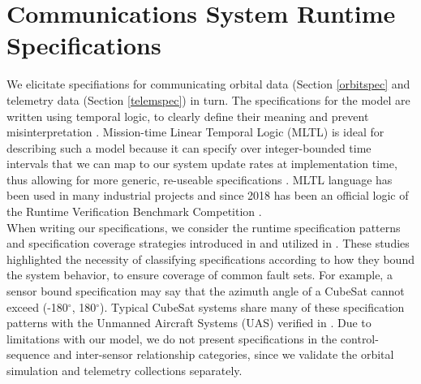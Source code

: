 \documentclass[conf]{new-aiaa}
\begin{document}
\section{Communications System Runtime Specifications}  
\label{CSRS}

We elicitate specifiations for communicating orbital data (Section \ref{orbitspec} and telemetry data (Section \ref{telemspec}) in turn. %
%
The specifications for the model are written using temporal logic, to clearly define their meaning and prevent misinterpretation \cite{Roz16}. Mission-time Linear Temporal Logic (MLTL) is ideal for describing such a model because it can specify over integer-bounded time intervals that we can map to our system update rates at implementation time, thus allowing for more generic, re-useable specifications \cite{RRS14,LVR19,LR18}.
MLTL language has been used in many industrial projects and since 2018 has been an official logic of the Runtime Verification Benchmark Competition \cite{RRS14,GRS14,SRRMMI15,RSI15,SMR15,SMR16,MRS17,RVBC2018,Cauwels2020,KZJZR20}.\\

When writing our specifications, we consider the runtime specification patterns and specification coverage strategies introduced in \cite{Roz16} and utilized in \cite{Cauwels2020}. These studies highlighted the necessity of classifying specifications according to how they bound the system behavior, to ensure coverage of common fault sets. For example, a sensor bound specification may say that the azimuth angle of a CubeSat cannot exceed (-180$^{\circ}$, 180$^{\circ}$). Typical CubeSat systems share many of these specification patterns with the Unmanned Aircraft Systems (UAS) verified in \cite{Cauwels2020}. Due to limitations with our model, we do not present specifications in the control-sequence and inter-sensor relationship categories, since we validate the orbital simulation and telemetry collections separately.
\end{document}

